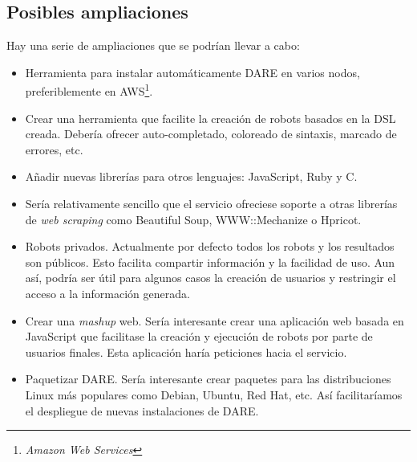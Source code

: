 \subsection{Posibles ampliaciones}

Hay una serie de ampliaciones que se podrían llevar a cabo:

\begin{itemize}
  \item Herramienta para instalar automáticamente DARE en varios
    nodos, preferiblemente en AWS\footnote{\emph{Amazon Web Services}}.
  \item Crear una herramienta que facilite la creación de robots
    basados en la DSL creada. Debería ofrecer auto-completado,
    coloreado de sintaxis, marcado de errores, etc.
  \item Añadir nuevas librerías para otros lenguajes: JavaScript, Ruby
    y C.
  \item Sería relativamente sencillo que el servicio ofreciese soporte
    a otras librerías de \emph{web scraping} como Beautiful
    Soup\cite{SOUP}, WWW::Mechanize\cite{MECHANIZE} o
    Hpricot\cite{HPRICOT}.
  \item Robots privados. Actualmente por defecto todos los robots y
    los resultados son públicos. Esto facilita compartir información y
    la facilidad de uso. Aun así, podría ser útil para algunos casos
    la creación de usuarios y restringir el acceso a la información
    generada.
  \item \label{MASHUP_REF} Crear una \emph{mashup}\cite{MASHUP} web. Sería
    interesante crear una aplicación web basada en JavaScript que
    facilitase la creación y ejecución de robots por parte de usuarios
    finales. Esta aplicación haría peticiones hacia el servicio.
  \item Paquetizar DARE. Sería interesante crear paquetes para las
    distribuciones Linux más populares como Debian, Ubuntu, Red Hat,
    etc. Así facilitaríamos el despliegue de nuevas instalaciones de
    DARE.
\end{itemize}
